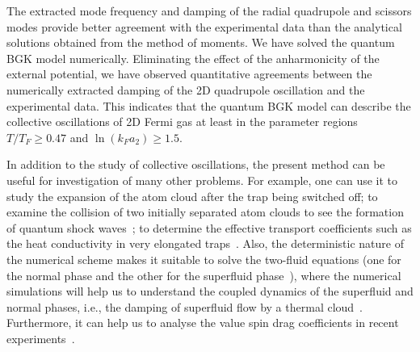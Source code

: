 The extracted mode frequency and damping of the radial quadrupole and scissors modes provide better agreement with the experimental data than the analytical solutions obtained from the method of moments. We have solved the quantum BGK model numerically. Eliminating the effect of the anharmonicity of the external potential, we have observed quantitative agreements between the numerically extracted damping of the 2D quadrupole oscillation and the experimental data. This indicates that the quantum BGK model can describe the collective oscillations of 2D Fermi gas at least in the parameter regions $T/T_F\geq0.47$ and $\ln(k_Fa_2)\geq1.5$.


In addition to the study of collective oscillations, the present method can be useful for investigation of many other problems. For example, one can use it to study the expansion of the atom cloud after the trap being switched off; to examine the collision of two initially separated atom clouds to see the formation of quantum shock waves~\cite{Joseph2001}; to determine the effective transport coefficients such as the heat conductivity in very elongated traps~\cite{Meppelink2009a}. Also, the deterministic nature of the numerical scheme makes it suitable to solve the two-fluid equations (one for the normal phase and the other for the superfluid phase~\cite{Jackson2002}), where the numerical simulations will help us to understand the coupled dynamics of the superfluid and normal phases, i.e., the damping of superfluid flow by a thermal cloud~\cite{Meppelink2009}. Furthermore, it can help us to analyse the value spin drag coefficients in recent experiments~\cite{Somme2011, Sommer2011b}.



